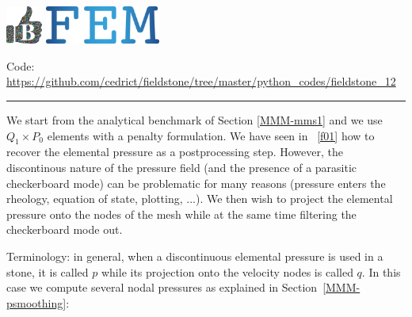 \includegraphics[height=1.25cm]{images/pictograms/benchmark}
\includegraphics[height=1.25cm]{images/pictograms/FEM}




\begin{center}
\inpython
{\small Code: \url{https://github.com/cedrict/fieldstone/tree/master/python_codes/fieldstone_12}}
\end{center}

\par\noindent\rule{\textwidth}{0.4pt}

We start from the analytical benchmark of Section \ref{MMM-mms1} and we use $Q_1 \times P_0$
elements with a penalty formulation. 
We have seen in \stone~\ref{f01} how to recover the elemental pressure as a postprocessing step. 
However, the discontinous nature of the pressure field (and the presence of a
parasitic checkerboard mode) can be problematic for many reasons 
(pressure enters the rheology, equation of state, plotting, ...). 
We then wish to project the elemental pressure onto the nodes of the mesh while at the same 
time filtering the checkerboard mode out. 

Terminology: in general, when a discontinuous elemental pressure is used in a stone, 
it is called $p$ while its projection onto the velocity nodes is called $q$. 
In this case we compute several nodal pressures as explained in Section~\ref{MMM-psmoothing}:

